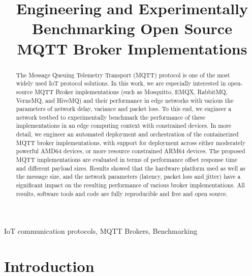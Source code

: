 \documentclass[conference]{IEEEtran}
\begin{document}
\title{Engineering and Experimentally Benchmarking Open Source MQTT Broker Implementations}




\author{
}

\maketitle

\begin{abstract}
    
    The Message Queuing Telemetry Transport (MQTT) protocol is one of the most widely used IoT protocol solutions. In this work, we are especially interested in open-source MQTT Broker
     implementations (such as Mosquitto, EMQX, RabbitMQ, VerneMQ, and HiveMQ) and their performance in edge networks with various  the parameters of network delay, variance and packet loss. To this end, we engineer a
    network testbed to experimentally benchmark the performance of these implementations in an edge
     computing context with constrained devices. In more detail, we engineer an automated deployment and
     orchestration of the containerized MQTT broker implementations, with support for deployment across
    either moderately powerful AMD64 devices, or more resource constrained ARM64 devices. The proposed
    MQTT implementations are evaluated in terms of performance offset response time and different payload sizes.
    Results showed that the hardware platform used as well as the message size, and the network parameters (latency, packet loss and jitter) have a significant impact on the resulting performance of various broker implementations. All results, software tools and code are fully reproducible and free and open source. 
    \end{abstract}
    

\begin{IEEEkeywords}
 IoT communication protocols, MQTT Brokers, Benchmarking
\end{IEEEkeywords}

\section{Introduction}
\end{document}
